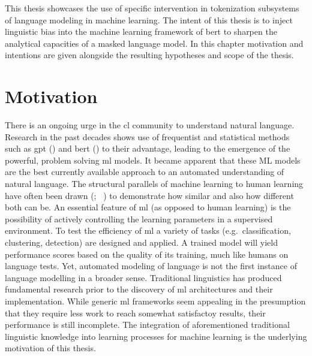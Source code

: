 
This thesis showcases the use of specific intervention in tokenization subsystems of language modeling in machine learning.
The intent of this thesis is to inject linguistic bias into the machine learning framework of \ac{bert} to sharpen the analytical capacities of a masked language model.
In this chapter motivation and intentions are given alongside the resulting hypotheses and scope of the thesis.


\section{Motivation}
\label{sec:motivation}
There is an ongoing urge in the \acf{cl} community to understand natural language.
Research in the past decades shows use of frequentist and statistical methods such as \ac{gpt} (\cite{gpt}) and \ac{bert} (\cite{ATTENTION}) to their advantage, leading to the emergence of the powerful, problem solving \ac{ml} models.
It became apparent that these ML models are the best currently available approach to an automated understanding of natural language.
The structural parallels of machine learning to human learning have often been drawn (\citeauthor{humanmachinelearning1}; ~\cite{humanmachinelearning2}) to demonstrate how similar and also how different both can be.
An essential feature of \ac{ml} (as opposed to human learning) is the possibility of actively controlling the learning parameters in a supervised environment.
To test the efficiency of  \ac{ml} a variety of tasks (e.g.\ classification, clustering, detection) are designed and applied.
A trained model will yield performance scores based on the quality of its training, much like humans on language tests.
Yet, automated modeling of language is not the first instance of language modelling in a broader sense.
Traditional linguistics has produced fundamental research prior to the discovery of \ac{ml} architectures and their implementation.
While generic \ac{ml} frameworks seem appealing in the presumption that they require less work to reach somewhat satisfactoy results,
their performance is still incomplete.
The integration of aforementioned traditional linguistic knowledge into learning processes for machine learning is the underlying motivation of this thesis.

